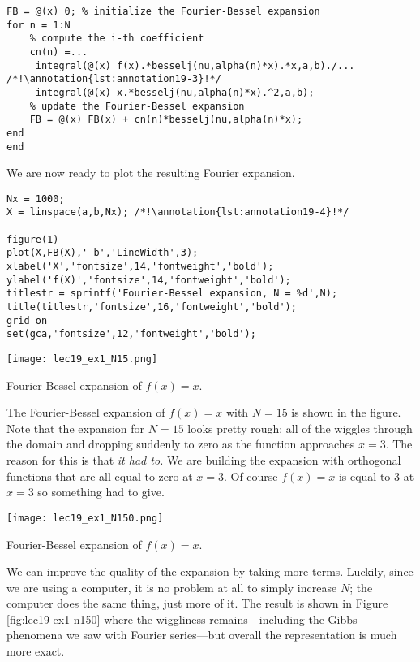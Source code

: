 \begin{enumerate}
\begin{lstlisting}[name=lec19_ex,style=myMatlab]
FB = @(x) 0; % initialize the Fourier-Bessel expansion
for n = 1:N
    % compute the i-th coefficient
    cn(n) =...
     integral(@(x) f(x).*besselj(nu,alpha(n)*x).*x,a,b)./... /*!\annotation{lst:annotation19-3}!*/
     integral(@(x) x.*besselj(nu,alpha(n)*x).^2,a,b);
    % update the Fourier-Bessel expansion
    FB = @(x) FB(x) + cn(n)*besselj(nu,alpha(n)*x); 
end
end
\end{lstlisting}
\end{enumerate}
We are now ready to plot the resulting Fourier expansion.

\begin{lstlisting}[name=lec19_ex,style=myMatlab]
Nx = 1000;
X = linspace(a,b,Nx); /*!\annotation{lst:annotation19-4}!*/

figure(1)
plot(X,FB(X),'-b','LineWidth',3);
xlabel('X','fontsize',14,'fontweight','bold');
ylabel('f(X)','fontsize',14,'fontweight','bold');
titlestr = sprintf('Fourier-Bessel expansion, N = %d',N);
title(titlestr,'fontsize',16,'fontweight','bold');
grid on
set(gca,'fontsize',12,'fontweight','bold');

\end{lstlisting}
\begin{marginfigure}
\texttt{[image: lec19\_ex1\_N15.png]}
\caption{Fourier-Bessel expansion of $f(x)=x$.}
\end{marginfigure}
The Fourier-Bessel expansion of $f(x)=x$ with $N=15$ is shown in the figure.  Note that the expansion for $N=15$ looks pretty rough; all of the wiggles through the domain and dropping suddenly to zero as the function approaches $x=3$.  The reason for this is that \emph{it had to.}  We are building the expansion with orthogonal functions that are all equal to zero at $x=3$.  Of course $f(x)=x$ is equal to 3 at $x=3$ so something had to give.  

\begin{marginfigure}
\texttt{[image: lec19\_ex1\_N150.png]}
\caption{Fourier-Bessel expansion of $f(x)=x$.}
\label{fig:lec19-ex1-n150}
\end{marginfigure}
We can improve the quality of the expansion by taking more terms.  Luckily, since we are using a computer, it is no problem at all to simply increase $N$; the computer does the same thing, just more of it.  The result is shown in Figure \ref{fig:lec19-ex1-n150} where the wiggliness remains---including the Gibbs phenomena we saw with Fourier series---but overall the representation is much more exact.

